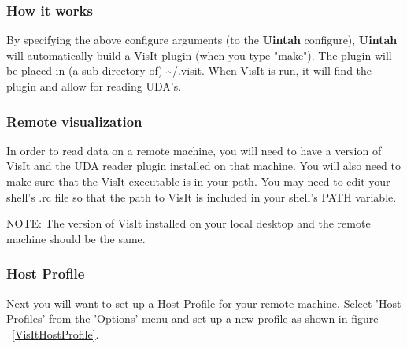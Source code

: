 \documentclass[12pt]{article}
\begin{document}
\subsubsection{How it works}
By specifying the above configure arguments (to the \textbf{Uintah}
configure), \textbf{Uintah} will automatically build a VisIt plugin
(when you type "make"). The plugin will be placed in (a sub-directory
of) \textasciitilde/.visit. When VisIt is run, it will find the plugin
and allow for reading UDA's.



\subsubsection{Remote visualization}
In order to read data on a remote machine, you will need to have a
version of VisIt and the UDA reader plugin installed on that
machine. You will also need to make sure that the VisIt executable is
in your path. You may need to edit your shell's .rc file so that the
path to VisIt is included in your shell's PATH variable.

NOTE: The version of VisIt installed on your local desktop and the
remote machine should be the same.

\subsubsection{Host Profile}
Next you will want to set up a Host Profile for your remote
machine. Select 'Host Profiles' from the 'Options' menu and set up a
new profile as shown in figure ~\ref{VisItHostProfile}.




\end{document}
